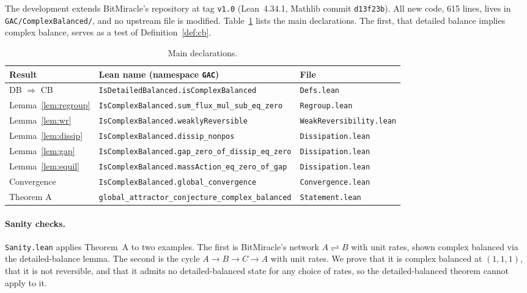 \documentclass[11pt]{article}
\newcommand{\lean}[1]{\texttt{#1}}
\theoremstyle{plain}
\theoremstyle{definition}
\theoremstyle{remark}
\begin{document}
The development extends BitMiracle's repository at tag \lean{v1.0} (Lean~4.34.1, Mathlib commit \lean{d13f23b}). All new code, 615 lines, lives in \lean{GAC/ComplexBalanced/}, and no upstream file is modified. Table~\ref{tab:lemmas} lists the main declarations. The first, that detailed balance implies complex balance, serves as a test of Definition~\ref{def:cb}.

\begin{table}[h]
\centering
\small
\begin{tabular}{@{}lll@{}}
\toprule
Result & Lean name (namespace \lean{GAC}) & File \\
\midrule
DB $\Rightarrow$ CB & \lean{IsDetailedBalanced.isComplexBalanced} & \lean{Defs.lean} \\
Lemma~\ref{lem:regroup} & \lean{IsComplexBalanced.sum\_flux\_mul\_sub\_eq\_zero} & \lean{Regroup.lean} \\
Lemma~\ref{lem:wr} & \lean{IsComplexBalanced.weaklyReversible} & \lean{WeakReversibility.lean} \\
Lemma~\ref{lem:dissip} & \lean{IsComplexBalanced.dissip\_nonpos} & \lean{Dissipation.lean} \\
Lemma~\ref{lem:gap} & \lean{IsComplexBalanced.gap\_zero\_of\_dissip\_eq\_zero} & \lean{Dissipation.lean} \\
Lemma~\ref{lem:equil} & \lean{IsComplexBalanced.massAction\_eq\_zero\_of\_gap} & \lean{Dissipation.lean} \\
Convergence & \lean{IsComplexBalanced.global\_convergence} & \lean{Convergence.lean} \\
Theorem A & \lean{global\_attractor\_conjecture\_complex\_balanced} & \lean{Statement.lean} \\
\bottomrule
\end{tabular}
\caption{Main declarations.}
\label{tab:lemmas}
\end{table}

\paragraph{Sanity checks.} \lean{Sanity.lean} applies Theorem~A to two examples. The first is BitMiracle's network $A \rightleftharpoons B$ with unit rates, shown complex balanced via the detailed-balance lemma. The second is the cycle $A \to B \to C \to A$ with unit rates. We prove that it is complex balanced at $(1,1,1)$, that it is not reversible, and that it admits no detailed-balanced state for any choice of rates, so the detailed-balanced theorem cannot apply to it.
\end{document}
